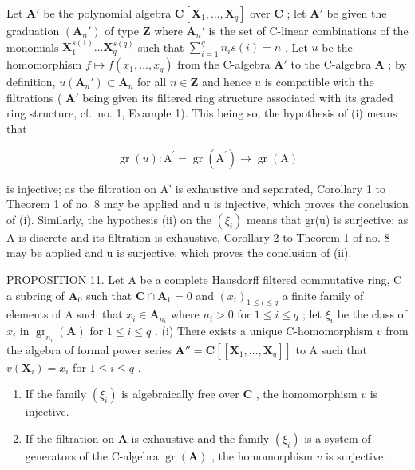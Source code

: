 Let \(\mathbf{A}'\) be the polynomial algebra \(\mathbf{C}[\mathbf{X}_1, \ldots, \mathbf{X}_q]\) over \(\mathbf{C}\) ; let \(\mathbf{A}'\) be given the graduation \((\mathbf{A}_n')\) of type \(\mathbf{Z}\) where \(\mathbf{A}_n'\) is the set of C-linear combinations of the monomials \(\mathbf{X}_1^{s(1)} \ldots \mathbf{X}_q^{s(q)}\) such that \(\sum_{i=1}^{q} n_i s(i) = n\) . Let \(u\) be the homomorphism \(f \mapsto f(x_1, \ldots, x_q)\) from the C-algebra \(\mathbf{A}'\) to the C-algebra \(\mathbf{A}\) ; by definition, \(u(\mathbf{A}_n') \subset \mathbf{A}_n\) for all \(n \in \mathbf{Z}\) and hence \(u\) is compatible with the filtrations ( \(\mathbf{A}'\) being given its filtered ring structure associated with its graded ring structure, cf.~no. 1, Example 1). This being so, the hypothesis of (i) means that

\[
\operatorname{gr} (u): \mathrm{A} ^ {\prime} = \operatorname{gr} (\mathrm{A} ^ {\prime}) \rightarrow \operatorname{gr} (\mathrm{A})
\]

is injective; as the filtration on A' is exhaustive and separated, Corollary 1 to Theorem 1 of no. 8 may be applied and u is injective, which proves the conclusion of (i). Similarly, the hypothesis (ii) on the \((\xi_{i})\) means that gr(u) is surjective; as A is discrete and its filtration is exhaustive, Corollary 2 to Theorem 1 of no. 8 may be applied and u is surjective, which proves the conclusion of (ii).

PROPOSITION 11. Let A be a complete Hausdorff filtered commutative ring, C a subring of \(\mathbf{A}_0\) such that \(\mathbf{C} \cap \mathbf{A}_1 = 0\) and \((x_i)_{1 \leqslant i \leqslant q}\) a finite family of elements of A such that \(x_i \in \mathbf{A}_{n_i}\) where \(n_i > 0\) for \(1 \leqslant i \leqslant q\) ; let \(\xi_i\) be the class of \(x_i\) in \(\operatorname{gr}_{n_i}(\mathbf{A})\) for \(1 \leqslant i \leqslant q\) . (i) There exists a unique C-homomorphism \(v\) from the algebra of formal power series \(\mathbf{A}'' = \mathbf{C}[[\mathbf{X}_1, \ldots, \mathbf{X}_q]]\) to A such that \(v(\mathbf{X}_i) = x_i\) for \(1 \leqslant i \leqslant q\) .

\begin{enumerate}
\def\labelenumi{(\roman{enumi})}
\setcounter{enumi}{1}
\item
  If the family \((\xi_{i})\) is algebraically free over \(\mathbf{C}\) , the homomorphism \(v\) is injective.
\item
  If the filtration on \(\mathbf{A}\) is exhaustive and the family \((\xi_{i})\) is a system of generators of the C-algebra \(\operatorname{gr}(\mathbf{A})\) , the homomorphism \(v\) is surjective.
\end{enumerate}

